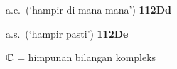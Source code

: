 \indexmedskip 
















a.e.\ (`hampir di mana-mana') {\bf 112Dd}

a.s.\ (`hampir pasti') {\bf 112De}



























\indexmedskip
{}











$\Bbb C$ = himpunan bilangan kompleks























































